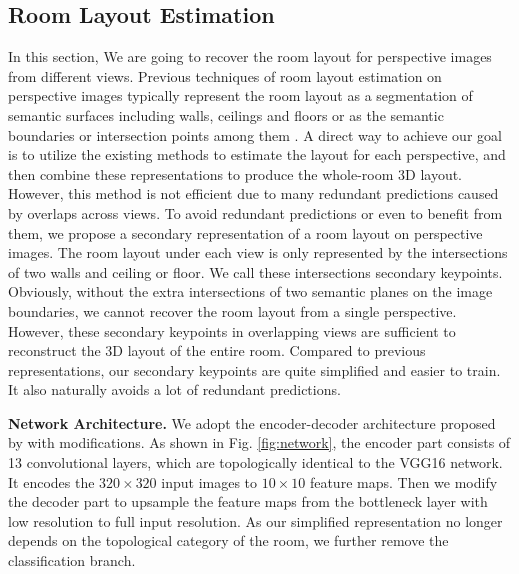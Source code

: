 \subsection{Room Layout Estimation}
\label{sec:layout}
In this section, We are going to recover the room layout for perspective images from different views. Previous techniques of room layout estimation on perspective images typically represent the room layout as a segmentation of semantic surfaces including walls, ceilings and floors \cite{Delay,ours} or as the semantic boundaries or intersection points among them \cite{CFILE}. A direct way to achieve our goal is to utilize the existing methods to estimate the layout for each perspective, and then combine these representations to produce the whole-room 3D layout. However, this method is not efficient due to many redundant predictions caused by overlaps across views. To avoid redundant predictions or even to benefit from them, we propose a secondary representation of a room layout on perspective images. The room layout under each view is only represented by the intersections of two walls and ceiling or floor. We call these intersections secondary keypoints. Obviously, without the extra intersections of two semantic planes on the image boundaries, we cannot recover the room layout from a single perspective. However, these secondary keypoints in overlapping views are sufficient to reconstruct the 3D layout of the entire room. Compared to previous representations, our secondary keypoints are quite simplified and easier to train. It also naturally avoids a lot of redundant predictions. 
 

\noindent\textbf{Network Architecture.} We adopt the encoder-decoder architecture proposed by \cite{roomnet} with modifications. As shown in Fig. \ref{fig:network}, the encoder part consists of 13 convolutional layers, which are topologically identical to the VGG16 network. It encodes the $320\times320$ input images to $10\times10$ feature maps. Then we modify the decoder part to upsample the feature maps from the bottleneck layer with low resolution to full input resolution. As our simplified representation no longer depends on the topological category of the room, we further remove the classification branch. 

